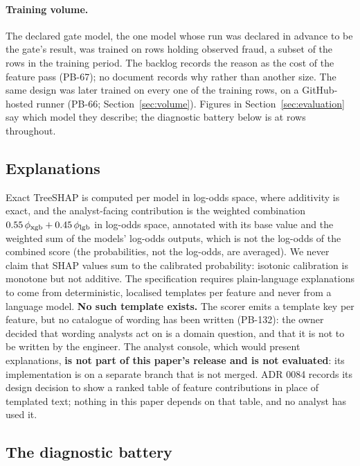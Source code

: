 \paragraph{Training volume.} The declared gate model, the one model whose run was declared in
advance to be the gate's result, was trained on \nTrainUsed{} rows holding
\nGateTrainFraud{} observed fraud, a subset of the \nTrainRows{} rows in the training period.
The backlog records the reason as the cost of the feature pass (PB-67); no document records why
\nTrainUsed{} rather than another size. The same design was later trained on every one of the \nFvTrainRows{} training rows, on a
GitHub-hosted runner (PB-66; Section~\ref{sec:volume}). Figures in Section~\ref{sec:evaluation} say
which model they describe; the diagnostic battery below is at \nTrainUsed{} rows throughout.

\subsection{Explanations}

Exact TreeSHAP \cite{lundberg2017shap,lundberg2020trees} is computed per model in log-odds space, where additivity is exact, and
the analyst-facing contribution is the weighted combination $0.55\,\phi_{\mathrm{xgb}} +
0.45\,\phi_{\mathrm{lgb}}$ in log-odds space, annotated with its base value and the weighted sum of the models' log-odds
outputs, which is not the log-odds of the combined score (the probabilities, not the log-odds, are
averaged). We never claim that SHAP values sum to the calibrated probability: isotonic calibration is
monotone but not additive. The specification requires plain-language explanations to come from
deterministic, localised templates per feature and never from a language model. \textbf{No such
template exists.} The scorer emits a template key per feature, but no catalogue of wording has been
written (PB-132): the owner decided that wording analysts act on is a domain question, and that it is
not to be written by the engineer. The analyst console, which would present explanations, \textbf{is
not part of this paper's release and is not evaluated}: its implementation is on a separate branch that
is not merged. ADR 0084 records its design decision to show a ranked table of feature contributions in
place of templated text; nothing in this paper depends on that table, and no analyst has used it.

\subsection{The diagnostic battery}

